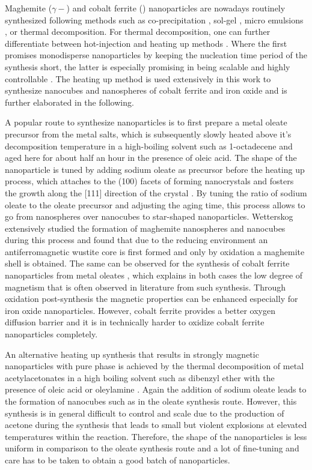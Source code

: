 \documentclass[\main/dresen_thesis.tex]{subfiles}
\begin{document}
  Maghemite ($\gamma-$) and cobalt ferrite () nanoparticles are nowadays routinely synthesized following methods such as co-precipitation \cite{Fried_2001_Order}, sol-gel \cite{Niederberger_2009_Metal}, micro emulsions \cite{Pillai_1996_Synth}, or thermal decomposition.
  For thermal decomposition, one can further differentiate between hot-injection \cite{Hyeon_2003_Chemi} and heating up methods \cite{Embden_2015_TheHe}.
  Where the first promises monodisperse nanoparticles by keeping the nucleation time period of the synthesis short, the latter is especially promising in being scalable and highly controllable \cite{Park_2004_Ultra}.
  The heating up method is used extensively in this work to synthesize nanocubes and nanospheres of cobalt ferrite and iron oxide and is further elaborated in the following.

  A popular route to synthesize nanoparticles is to first prepare a metal oleate precursor from the metal salts, which is subsequently slowly heated above it's decomposition temperature in a high-boiling solvent such as 1-octadecene and aged here for about half an hour in the presence of oleic acid.
  The shape of the nanoparticle is tuned by adding sodium oleate as precursor before the heating up process, which attaches to the (100) facets of forming nanocrystals and fosters the growth along the [111] direction of the crystal \cite{Bao_2009_Forma}.
  By tuning the ratio of sodium oleate to the oleate precursor and adjusting the aging time, this process allows to go from nanospheres over nanocubes to star-shaped nanoparticles.
  Wetterskog \etal extensively studied the formation of maghemite nanospheres and nanocubes during this process \cite{Wetterskog_2014_Preci, Wetterskog_2013_Anoma} and found that due to the reducing environment an antiferromagnetic wustite core is first formed and only by oxidation a maghemite shell is obtained.
  The same can be observed for the synthesis of cobalt ferrite nanoparticles from metal oleates \cite{Bodnarchuk_2009_Excha}, which explains in both cases the low degree of magnetism that is often observed in literature from such synthesis.
  Through oxidation post-synthesis the magnetic properties can be enhanced especially for iron oxide nanoparticles.
  However, cobalt ferrite provides a better oxygen diffusion barrier \cite{Chen_2015_Synth} and it is in technically harder to oxidize cobalt ferrite nanoparticles completely.

  An alternative heating up synthesis that results in strongly magnetic nanoparticles with pure phase is achieved by the thermal decomposition of metal acetylacetonates in a high boiling solvent such as dibenzyl ether with the presence of oleic acid or oleylamine \cite{Sun_2002_SizeC, Wu_2014_Monol}.
  Again the addition of sodium oleate leads to the formation of nanocubes such as in the oleate synthesis route.
  However, this synthesis is in general difficult to control and scale due to the production of acetone during the synthesis that leads to small but violent explosions at elevated temperatures within the reaction.
  Therefore, the shape of the nanoparticles is less uniform in comparison to the oleate synthesis route and a lot of fine-tuning and care has to be taken to obtain a good batch of nanoparticles.
\end{document}
